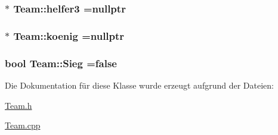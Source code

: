 \subsubsection[{helfer3}]{ $\ast$ Team\+::helfer3 =nullptr\hspace{0.3cm}{\ttfamily [private]}}\label{class_team_a5d3c196e4039c8e4666fcd0156f3129b}
\hypertarget{class_team_a7e8d3c991b52c5bb72ddeaf2a4cec935}{}
\subsubsection[{koenig}]{$\ast$ Team\+::koenig =nullptr\hspace{0.3cm}{\ttfamily [private]}}\label{class_team_a7e8d3c991b52c5bb72ddeaf2a4cec935}
\hypertarget{class_team_af4db822bc0edd1ff703f3c792b4df99e}{}
\subsubsection[{Sieg}]{\setlength{\rightskip}{0pt plus 5cm}bool Team\+::\+Sieg =false\hspace{0.3cm}{\ttfamily [private]}}\label{class_team_af4db822bc0edd1ff703f3c792b4df99e}


Die Dokumentation für diese Klasse wurde erzeugt aufgrund der Dateien\+:\begin{DoxyCompactItemize}
\item 
\hyperlink{_team_8h}{Team.\+h}\item 
\hyperlink{_team_8cpp}{Team.\+cpp}\end{DoxyCompactItemize}
